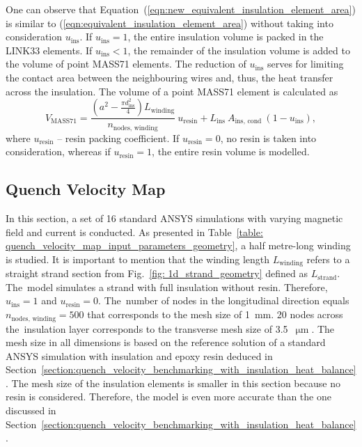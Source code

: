 One can observe that Equation~(\ref{eqn:new_equivalent_insulation_element_area}) is similar to (\ref{eqn:equivalent_insulation_element_area}) without taking into consideration $u_\text{ins}$. If $u_\text{ins} = 1$, the entire insulation volume is packed in the LINK33 elements. If $u_\text{ins} < 1$, the remainder of the insulation volume is added to the volume of point MASS71 elements. The reduction of $u_\text{ins}$ serves for limiting the contact area between the neighbouring wires and, thus, the heat transfer across the insulation. The volume of a point MASS71 element is calculated as 
\begin{equation}
    V_\text{MASS71} = \frac{\left( a^2 - \frac{\pi d_\text{ins}^2}{4} \right) L_\text{winding}}{n_\text{nodes, winding}}~u_\text{resin} + L_\text{ins}~A_\text{ins, cond} ~ \left( 1-u_\text{ins} \right),
    \label{eqn:mass71_volume_element}
\end{equation}
where $u_\text{resin}$ -- resin packing coefficient. If $u_\text{resin} = 0$, no resin is taken into consideration, whereas if $u_\text{resin} = 1$, the entire resin volume is modelled.

\subsection{Quench Velocity Map}

In this section, a set of 16 standard ANSYS simulations with varying magnetic field and current is conducted. As presented in Table~\ref{table: quench_velocity_map_input_parameters_geometry}, a half metre-long winding is studied. It is important to mention that the winding length $L_\text{winding}$ refers to a straight strand section from Fig.~\ref{fig: 1d_strand_geometry} defined as $L_\text{strand}$. The~model simulates a strand with full insulation without resin. Therefore, $u_\text{ins}=1$ and $u_\text{resin}=0$. The~number of nodes in the longitudinal direction equals $n_\text{nodes, winding}=500$ that corresponds to the mesh size of 1~mm. 20 nodes across the~insulation layer corresponds to the transverse mesh size of 3.5~$\upmu \text{m}$. The mesh size in all dimensions is based on the reference solution of a standard ANSYS simulation with insulation and epoxy resin deduced in Section~\ref{section:quench_velocity_benchmarking_with_insulation_heat_balance}. The mesh size of the insulation elements is smaller in this section because no resin is considered. Therefore, the model is even more accurate than the one discussed in Section~\ref{section:quench_velocity_benchmarking_with_insulation_heat_balance}.  

